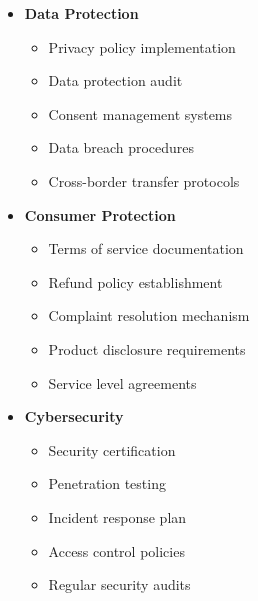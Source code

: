 \begin{tcolorbox}[
    colback=white,
    colframe=primarydark,
    title=\textbf{NITDA and Consumer Protection Requirements},
    before skip=1em,
    after skip=1em
]
    \begin{itemize}[leftmargin=*,itemsep=0.5em]
        \item \textbf{Data Protection}
        \begin{itemize}[itemsep=0.3em]
            \item Privacy policy implementation
            \item Data protection audit
            \item Consent management systems
            \item Data breach procedures
            \item Cross-border transfer protocols
        \end{itemize}

        \vspace{0.5em}

        \item \textbf{Consumer Protection}
        \begin{itemize}[itemsep=0.3em]
            \item Terms of service documentation
            \item Refund policy establishment
            \item Complaint resolution mechanism
            \item Product disclosure requirements
            \item Service level agreements
        \end{itemize}

        \vspace{0.5em}

        \item \textbf{Cybersecurity}
        \begin{itemize}[itemsep=0.3em]
            \item Security certification
            \item Penetration testing
            \item Incident response plan
            \item Access control policies
            \item Regular security audits
        \end{itemize}

        \vspace{0.5em}


\end{itemize}
\end{tcolorbox}
